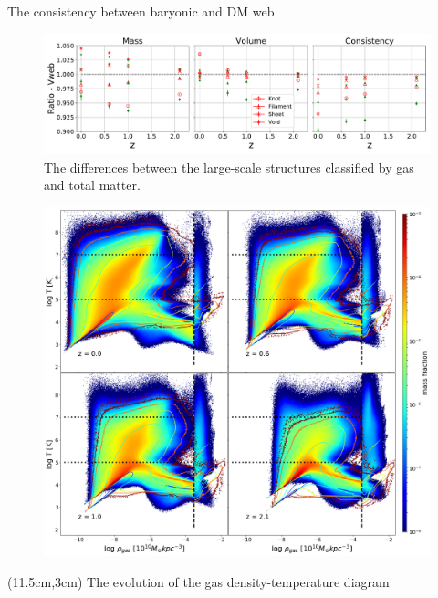 \documentclass[aspectratio=169]{beamer}
\begin{document}
\begin{frame}{The consistency between baryonic and DM web}
  \begin{figure}
    \includegraphics[width=\linewidth]{MV-fractions-diff-vweb.pdf}
    \caption{The differences between the large-scale structures classified by gas and total matter.}
  \end{figure}
\end{frame}

\begin{frame}[plain,t]
\vspace{-0.3cm}
  \begin{figure}
  \hspace{-3cm}
    \includegraphics[height=\textheight]{RT-evolution.png}
  \end{figure}
  \begin{textblock*}{4cm}(11.5cm,3cm)
  {The evolution of the gas density-temperature diagram}
  \end{textblock*}
\end{frame}
\end{document}
